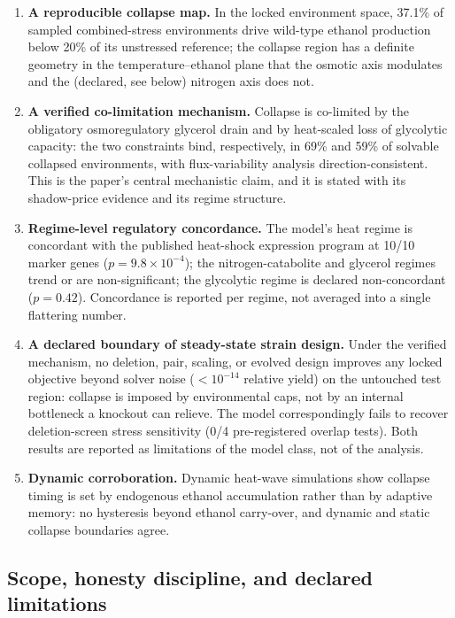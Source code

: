 \documentclass[12pt]{article}
\begin{document}
\begin{enumerate}
\item \textbf{A reproducible collapse map.} In the locked environment
space, 37.1\% of sampled combined-stress environments drive wild-type
ethanol production below 20\% of its unstressed reference; the collapse
region has a definite geometry in the temperature--ethanol plane that the
osmotic axis modulates and the (declared, see below) nitrogen axis does
not.
\item \textbf{A verified co-limitation mechanism.} Collapse is co-limited
by the obligatory osmoregulatory glycerol drain and by heat-scaled loss of
glycolytic capacity: the two constraints bind, respectively, in 69\% and
59\% of solvable collapsed environments, with flux-variability analysis
direction-consistent. This is the paper's central mechanistic claim, and
it is stated with its shadow-price evidence and its regime structure.
\item \textbf{Regime-level regulatory concordance.} The model's heat
regime is concordant with the published heat-shock expression program at
10/10 marker genes ($p=9.8\times10^{-4}$); the nitrogen-catabolite and
glycerol regimes trend or are non-significant; the glycolytic regime is
declared non-concordant ($p=0.42$). Concordance is reported per regime,
not averaged into a single flattering number.
\item \textbf{A declared boundary of steady-state strain design.} Under
the verified mechanism, no deletion, pair, scaling, or evolved design
improves any locked objective beyond solver noise ($<10^{-14}$ relative
yield) on the untouched test region: collapse is imposed by environmental
caps, not by an internal bottleneck a knockout can relieve. The model
correspondingly fails to recover deletion-screen stress sensitivity
(0/4 pre-registered overlap tests). Both results are reported as
limitations of the model class, not of the analysis.
\item \textbf{Dynamic corroboration.} Dynamic heat-wave simulations show
collapse timing is set by endogenous ethanol accumulation rather than by
adaptive memory: no hysteresis beyond ethanol carry-over, and dynamic and
static collapse boundaries agree.
\end{enumerate}

\subsection{Scope, honesty discipline, and declared limitations}
\end{document}
